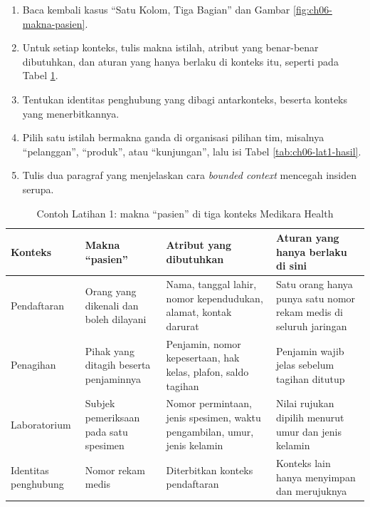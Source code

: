 \begin{enumerate}
  \item Baca kembali kasus ``Satu Kolom, Tiga Bagian'' dan Gambar \ref{fig:ch06-makna-pasien}.
  \item Untuk setiap konteks, tulis makna istilah, atribut yang benar-benar dibutuhkan, dan aturan
        yang hanya berlaku di konteks itu, seperti pada Tabel \ref{tab:ch06-lat1-contoh}.
  \item Tentukan identitas penghubung yang dibagi antarkonteks, beserta konteks yang
        menerbitkannya.
  \item Pilih satu istilah bermakna ganda di organisasi pilihan tim, misalnya ``pelanggan'',
        ``produk'', atau ``kunjungan'', lalu isi Tabel \ref{tab:ch06-lat1-hasil}.
  \item Tulis dua paragraf yang menjelaskan cara \textit{bounded context} mencegah insiden serupa.
\end{enumerate}

\begin{table}[!htb]
  \centering
  \caption{Contoh Latihan 1: makna ``pasien'' di tiga konteks Medikara Health}
  \label{tab:ch06-lat1-contoh}
  \footnotesize
  \begin{tabularx}{\textwidth}{>{\raggedright\arraybackslash}p{2.0cm} >{\raggedright\arraybackslash}X >{\raggedright\arraybackslash}X >{\raggedright\arraybackslash}X}
    \hline
    \textbf{Konteks} & \textbf{Makna ``pasien''} & \textbf{Atribut yang dibutuhkan} &
      \textbf{Aturan yang hanya berlaku di sini} \\ \hline
    Pendaftaran & Orang yang dikenali dan boleh dilayani & Nama, tanggal lahir, nomor
      kependudukan, alamat, kontak darurat & Satu orang hanya punya satu nomor rekam medis di
      seluruh jaringan \\ \hline
    Penagihan & Pihak yang ditagih beserta penjaminnya & Penjamin, nomor kepesertaan, hak kelas,
      plafon, saldo tagihan & Penjamin wajib jelas sebelum tagihan ditutup \\ \hline
    Laboratorium & Subjek pemeriksaan pada satu spesimen & Nomor permintaan, jenis spesimen, waktu
      pengambilan, umur, jenis kelamin & Nilai rujukan dipilih menurut umur dan jenis kelamin \\
      \hline
    Identitas penghubung & Nomor rekam medis & Diterbitkan konteks pendaftaran & Konteks lain hanya
      menyimpan dan merujuknya \\ \hline
  \end{tabularx}
\end{table}

